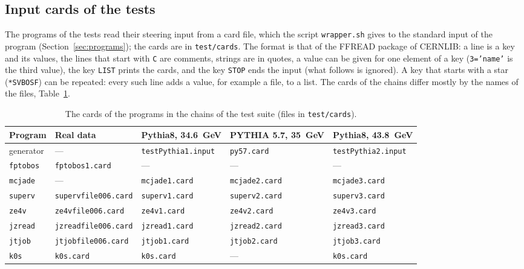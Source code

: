 \subsection{Input cards of the tests}
\label{sec:testcards}
The programs of the tests read their steering input from a card file, which the script \texttt{wrapper.sh} gives to the standard input of the program (Section~\ref{sec:programs}); the cards are in
\texttt{test/\allowbreak{}cards}. The format is that of the FFREAD package of CERNLIB: a line is a key and its values, the lines that start with \texttt{C} are comments, strings are in quotes, a value can be given for
one element of a key (\texttt{3='name'} is the third value), the key \texttt{LIST} prints the cards, and the key \texttt{STOP} ends the input (what follows is ignored). A key that starts with a star
(\texttt{*SVBOSF}) can be repeated: every such line adds a value, for example a file, to a list. The cards of the chains differ mostly by the names of the files, Table~\ref{tab:cardsbychain}.
\begin{table}[H]\centering\scriptsize\setlength{\tabcolsep}{3pt}
\begin{tabular}{|l|l|l|l|l|}\hline
Program & Real data & Pythia8, 34.6~GeV & PYTHIA 5.7, 35~GeV & Pythia8, 43.8~GeV \\\hline\hline
generator & --- & \texttt{testPythia1.input} & \texttt{py57.card} & \texttt{testPythia2.input} \\
\texttt{fptobos} & \texttt{fptobos1.card} & --- & --- & --- \\
\texttt{mcjade} & --- & \texttt{mcjade1.card} & \texttt{mcjade2.card} & \texttt{mcjade3.card} \\
\texttt{superv} & \texttt{supervfile006.card} & \texttt{superv1.card} & \texttt{superv2.card} & \texttt{superv3.card} \\
\texttt{ze4v} & \texttt{ze4vfile006.card} & \texttt{ze4v1.card} & \texttt{ze4v2.card} & \texttt{ze4v3.card} \\
\texttt{jzread} & \texttt{jzreadfile006.card} & \texttt{jzread1.card} & \texttt{jzread2.card} & \texttt{jzread3.card} \\
\texttt{jtjob} & \texttt{jtjobfile006.card} & \texttt{jtjob1.card} & \texttt{jtjob2.card} & \texttt{jtjob3.card} \\
\texttt{k0s} & \texttt{k0s.card} & \texttt{k0s.card} & --- & \texttt{k0s.card} \\\hline
\end{tabular}
\caption{The cards of the programs in the chains of the test suite (files in \texttt{test/\allowbreak{}cards}).}
\label{tab:cardsbychain}
\end{table}

